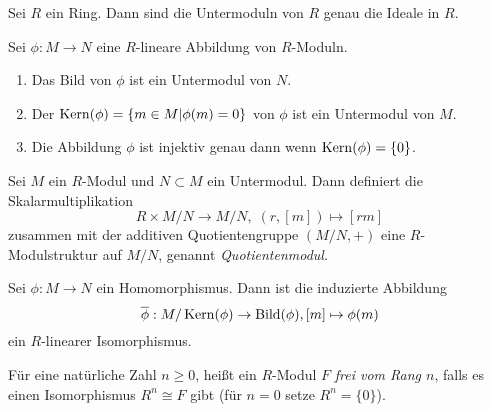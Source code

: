 \documentclass{book}
\begin{document}
\begin{exa}
    \label{exa:idealmodul} 
    Sei $R$ ein Ring. Dann sind die Untermoduln von $R$ genau die Ideale in $R$.
\end{exa}

\begin{prop} Sei $\phi: M \to N$ eine $R$-lineare Abbildung von $R$-Moduln. 
    \label{prop:kernmodul}
    \begin{enumerate}
        \item Das Bild von $\phi$ ist ein Untermodul von $N$.
        \item Der $\Kern(\phi) = \{ m \in M | \phi(m) = 0\}$ von $\phi$
            ist ein Untermodul von $M$.
        \item Die Abbildung $\phi$ ist injektiv genau dann wenn $\Kern(\phi) = \{0\}$. 
    \end{enumerate}
\end{prop}

\begin{defi}
    \label{defi:quot}
    Sei $M$ ein $R$-Modul und $N \subset M$ ein Untermodul. Dann definiert die Skalarmultiplikation
    \[
        R \times M/N \to M/N, \; (r,[m]) \mapsto [rm]
    \]
    zusammen mit der additiven Quotientengruppe $(M/N, +)$ eine
    $R$-Modulstruktur auf $M/N$, genannt \emph{Quotientenmodul}.
\end{defi}

\begin{prop}
    \label{prop:homsatz}
    Sei $\phi: M \to N$ ein Homomorphismus. Dann ist die induzierte Abbildung
    \[
        \overline{\phi}: M/\Kern(\phi) \to \Bild(\phi), [m] \mapsto \phi(m)
    \]
    ein $R$-linearer Isomorphismus.
\end{prop}

\begin{defi}
    \label{defi:freiermodul}
    Für eine natürliche Zahl $n \ge 0$, heißt ein $R$-Modul $F$ \emph{frei vom
    Rang $n$}, falls es einen Isomorphismus $R^n \cong F$ gibt (für $n=0$ setze
    $R^n = \{0\}$). 
\end{defi}
\end{document}

